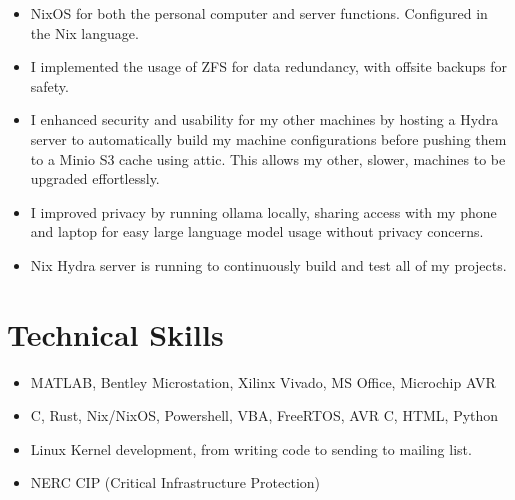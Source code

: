 \documentclass{lsanche_cv}
\begin{document}
\begin{itemize}
\item NixOS for both the personal computer and server functions. Configured in the Nix language.
\item I implemented the usage of ZFS for data redundancy, with offsite backups for safety.
\item I enhanced security and usability for my other machines by hosting a Hydra server to automatically build my machine configurations before pushing them to a Minio S3 cache using attic. This allows my other, slower, machines to be upgraded effortlessly.
\item I improved privacy by running ollama locally, sharing access with my phone and laptop for easy large language model usage without privacy concerns.
\item Nix Hydra server is running to continuously build and test all of my projects.
\end{itemize}

\section{Technical Skills}
\begin{itemize}
\item MATLAB, Bentley Microstation, Xilinx Vivado, MS Office, Microchip AVR
\item C, Rust, Nix/NixOS, Powershell, VBA, FreeRTOS, AVR C, HTML, Python
\item Linux Kernel development, from writing code to sending to mailing list.
\item NERC CIP (Critical Infrastructure Protection)
\end{itemize}
\end{document}
